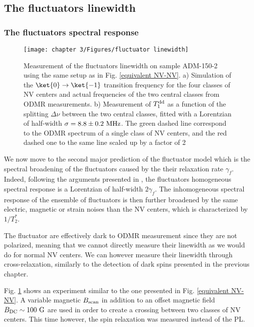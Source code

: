 \documentclass[a4paper, 11pt]{book}
\begin{document}
\subsection{The fluctuators linewidth}

\subsubsection{The fluctuators spectral response}
\begin{figure}[h]
\centering
\texttt{[image: chapter 3/Figures/fluctuator linewidth]}
\caption{Measurement of the fluctuators linewidth on sample ADM-150-2 using the same setup as in Fig. \ref{equivalent NV-NV}. a) Simulation of the $\ket{0} \to \ket{-1}$ transition frequency for the four classes of NV centers and actual frequencies of the two central classes from ODMR measurements. b) Measurement of $T_1^{\rm dd}$ as a function of the splitting $\Delta \nu$ between the two central classes, fitted with a Lorentzian of half-width $\sigma=8.8 \pm 0.2\ \rm MHz$. The green dashed line correspond to the ODMR spectrum of a single class of NV centers, and the red dashed one to the same line scaled up by a factor of 2}
\label{fluct linewidth}
\end{figure}

We now move to the second major prediction of the fluctuator model which is the spectral broadening of the fluctuators caused by the their relaxation rate $\gamma_f$. Indeed, following the arguments presented in \citep{choi2017depolarization}, the fluctuators homogeneous spectral response is a Lorentzian of half-width $2\gamma_f$. The inhomogeneous spectral response of the ensemble of fluctuators is then further broadened by the same electric, magnetic or strain noises than the NV centers, which is characterized by $1/T_2^*$.

The fluctuator are effectively dark to ODMR measurement since they are not polarized, meaning that we cannot directly measure their linewidth as we would do for normal NV centers. We can however measure their linewidth through cross-relaxation, similarly to the detection of dark spins presented in the previous chapter.

Fig. \ref{fluct linewidth} shows an experiment similar to the one presented in Fig. \ref{equivalent NV-NV}. A variable magnetic $B_{\rm scan}$ in addition to an offset magnetic field $B_{\rm DC} \sim 100\ \rm G$ are used in order to create a crossing between two classes of NV centers. This time however, the spin relaxation was measured instead of the PL.
\end{document}
